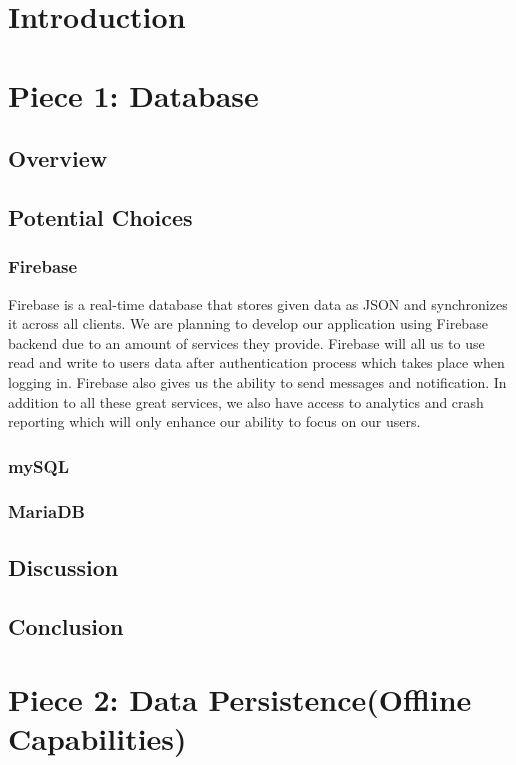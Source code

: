 \documentclass[onecolumn, draftclsnofoot,10pt, compsoc]{IEEEtran}
\begin{document}
\newpage
{}
\tableofcontents
\clearpage

\section{Introduction}
\section{Piece 1: Database}
\subsection{Overview}
\subsection{Potential Choices}
\subsubsection{Firebase}
Firebase is a real-time database that stores given data as JSON and synchronizes it across all clients. We are planning to develop our application using Firebase backend due to an amount of services they provide. Firebase will all us to use read and write to users data after authentication process which takes place when logging in. Firebase also gives us the ability to send messages and notification. In addition to all these great services, we also have access to analytics and crash reporting which will only enhance our ability to focus on our users.

\subsubsection{mySQL}
\subsubsection{MariaDB}
\subsection{Discussion}
\subsection{Conclusion}

\section{Piece 2: Data Persistence(Offline Capabilities)}
\end{document}
